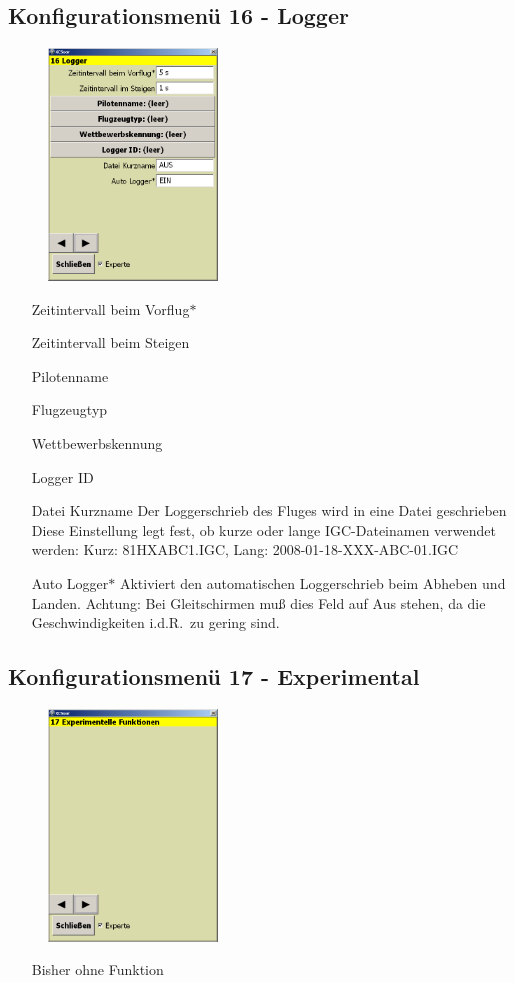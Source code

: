 \subsection{Konfigurationsmenü 16 - Logger}\label{Konfig16}
\begin{figure}
\includegraphics[width=4.5cm]{Bilder/Konfig16Logger.png}
\end{figure}
\begin{enumerate}
\item[Zeitintervall beim Vorflug$\ast$]
\item[Zeitintervall beim Steigen]
\item[Pilotenname]
\item[Flugzeugtyp]
\item[Wettbewerbskennung]
\item[Logger ID]
\item[Datei Kurzname] Der Loggerschrieb des Fluges wird in eine Datei geschrieben
Diese Einstellung legt fest, ob kurze oder lange IGC-Dateinamen verwendet werden:
Kurz: 81HXABC1.IGC,  Lang: 2008-01-18-XXX-ABC-01.IGC
\item[Auto Logger$\ast$] Aktiviert den automatischen Loggerschrieb beim Abheben und Landen. Achtung: Bei Gleitschirmen muß dies Feld auf Aus stehen, da die Geschwindigkeiten i.d.R.\ zu gering sind.
\end{enumerate}

\subsection{Konfigurationsmenü 17 - Experimental}\label{Konfig17}
\begin{figure}
\includegraphics[width=4.5cm]{Bilder/Konfig17Experimental.png}
\end{figure}
\begin{enumerate}
\item[Bisher ohne Funktion]
\end{enumerate}